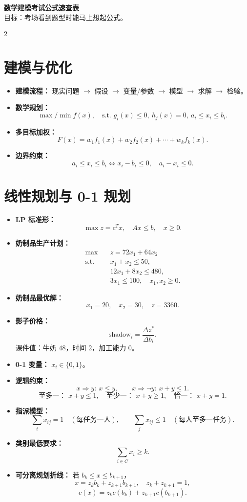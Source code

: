 \documentclass[UTF8,fontset=windows,10pt,a4paper]{ctexart}
\newcommand{\tagline}[1]{\textbf{\color{blue!60!black}#1：}}
\begin{document}
\begin{center}
{\Large \bfseries 数学建模考试公式速查表}\\
{\small 目标：考场看到题型时能马上想起公式。}
\end{center}

\begin{multicols}{2}

\section{建模与优化}
\begin{itemize}
  \item \tagline{建模流程} 现实问题 $\to$ 假设 $\to$ 变量/参数 $\to$ 模型 $\to$ 求解 $\to$ 检验。
  \item \tagline{数学规划}
  \[
    \max/\min f(x),\quad
    \text{s.t. } g_i(x)\le 0,\ h_j(x)=0,\ a_i\le x_i\le b_i .
  \]
  \item \tagline{多目标加权}
  \[
    F(x)=w_1 f_1(x)+w_2 f_2(x)+\cdots+w_k f_k(x).
  \]
  \item \tagline{边界约束}
  \[
    a_i\le x_i\le b_i
    \Longleftrightarrow
    x_i-b_i\le0,\quad a_i-x_i\le0.
  \]
\end{itemize}

\section{线性规划与 0-1 规划}
\begin{itemize}
  \item \tagline{LP 标准形}
  \[
    \max z=c^T x,\quad Ax\le b,\quad x\ge0.
  \]
  \item \tagline{奶制品生产计划}
  \[
  \begin{aligned}
    \max\quad & z=72x_1+64x_2\\
    \text{s.t.}\quad & x_1+x_2\le 50,\\
    &12x_1+8x_2\le 480,\\
    &3x_1\le100,\quad x_1,x_2\ge0.
  \end{aligned}
  \]
  \item \tagline{奶制品最优解}
  \[
    x_1=20,\quad x_2=30,\quad z=3360.
  \]
  \item \tagline{影子价格}
  \[
    \text{shadow}_i=\frac{\Delta z^*}{\Delta b_i}.
  \]
  课件值：牛奶 $48$，时间 $2$，加工能力 $0$。
  \item \tagline{0-1 变量} $x_i\in\{0,1\}$。
  \item \tagline{逻辑约束}
  \[
    x\Rightarrow y:\ x\le y,\qquad
    x\Rightarrow \neg y:\ x+y\le1.
  \]
  \[
    \text{至多一： }x+y\le1,\quad
    \text{至少一： }x+y\ge1,\quad
    \text{恰一： }x+y=1.
  \]
  \item \tagline{指派模型}
  \[
    \sum_i x_{ij}=1 \quad(\text{每任务一人}),\qquad
    \sum_j x_{ij}\le1 \quad(\text{每人至多一任务}).
  \]
  \item \tagline{类别最低要求}
  \[
    \sum_{i\in C}x_i\ge k.
  \]
  \item \tagline{可分离规划折线}
  若 $b_k\le x\le b_{k+1}$，
  \[
    x=z_kb_k+z_{k+1}b_{k+1},\quad
    z_k+z_{k+1}=1,
  \]
  \[
    c(x)=z_kc(b_k)+z_{k+1}c(b_{k+1}).
  \]
\end{itemize}


\end{multicols}
\end{document}
